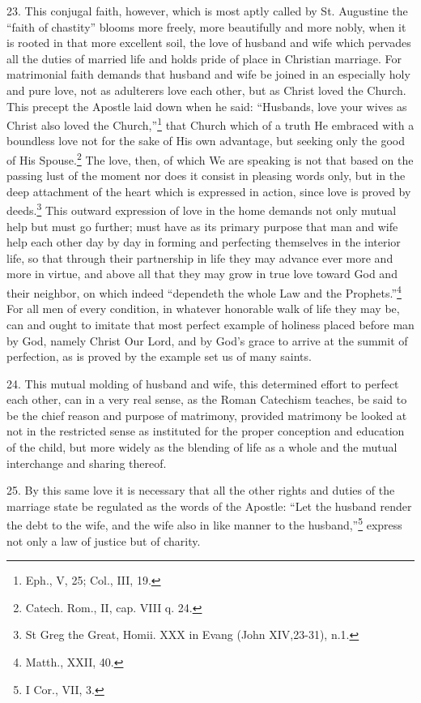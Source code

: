 \documentclass[12pt,a4paper]{book}
\begin{document}
23. This conjugal faith, however, which is most aptly called by St. Augustine the ``faith of chastity'' blooms more freely, more beautifully and more nobly, when it is rooted in that more excellent soil, the love of husband and wife which pervades all the duties of married life and holds pride of place in Christian marriage. For matrimonial faith demands that husband and wife be joined in an especially holy and pure love, not as adulterers love each other, but as Christ loved the Church. This precept the Apostle laid down when he said: ``Husbands, love your wives as Christ also loved the Church,''\footnote{Eph., V, 25; Col., III, 19.} that Church which of a truth He embraced with a boundless love not for the sake of His own advantage, but seeking only the good of His Spouse.\footnote{Catech. Rom., II, cap. VIII q. 24.} The love, then, of which We are speaking is not that based on the passing lust of the moment nor does it consist in pleasing words only, but in the deep attachment of the heart which is expressed in action, since love is proved by deeds.\footnote{St Greg the Great, Homii. XXX in Evang (John XIV,23-31), n.1.} This outward expression of love in the home demands not only mutual help but must go further; must have as its primary purpose that man and wife help each other day by day in forming and perfecting themselves in the interior life, so that through their partnership in life they may advance ever more and more in virtue, and above all that they may grow in true love toward God and their neighbor, on which indeed ``dependeth the whole Law and the Prophets.''\footnote{Matth., XXII, 40.} For all men of every condition, in whatever honorable walk of life they may be, can and ought to imitate that most perfect example of holiness placed before man by God, namely Christ Our Lord, and by God's grace to arrive at the summit of perfection, as is proved by the example set us of many saints.

24. This mutual molding of husband and wife, this determined effort to perfect each other, can in a very real sense, as the Roman Catechism teaches, be said to be the chief reason and purpose of matrimony, provided matrimony be looked at not in the restricted sense as instituted for the proper conception and education of the child, but more widely as the blending of life as a whole and the mutual interchange and sharing thereof.

25. By this same love it is necessary that all the other rights and duties of the marriage state be regulated as the words of the Apostle: ``Let the husband render the debt to the wife, and the wife also in like manner to the husband,''\footnote{I Cor., VII, 3.} express not only a law of justice but of charity.
\end{document}
